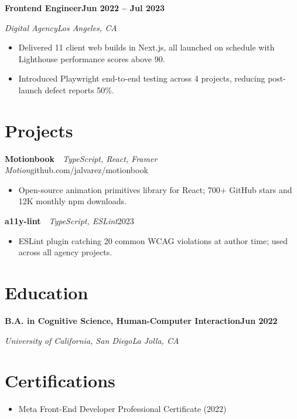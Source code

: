 \documentclass[letterpaper,10pt]{article}
\newcommand{\rRole}[4]{%
  \vspace{3pt}%
  \noindent\textbf{#1}\hfill\textbf{#4}\par
  \noindent\textit{\color{muted}#2}\hfill\textit{\color{muted}#3}\par
  \vspace{1pt}%
}
\newcommand{\rProject}[3]{%
  \vspace{3pt}%
  \noindent\textbf{#1}\ \textbar\ \textit{\color{muted}#2}\hfill#3\par
  \vspace{1pt}%
}
\newcommand{\rEdu}[4]{%
  \vspace{3pt}%
  \noindent\textbf{#1}\hfill\textbf{#4}\par
  \noindent\textit{\color{muted}#2}\hfill\textit{\color{muted}#3}\par
  \vspace{1pt}%
}
\newenvironment{rBullets}
  {\begin{itemize}[leftmargin=13pt,itemsep=2pt,parsep=0pt,topsep=2pt,
                   partopsep=0pt,label=\textbullet]}
  {\end{itemize}}
\begin{document}
\rRole{Frontend Engineer}{Digital Agency}{Los Angeles, CA}{Jun 2022 -- Jul 2023}
\begin{rBullets}
  \item Delivered 11 client web builds in Next.js, all launched on schedule with Lighthouse performance scores above 90.
  \item Introduced Playwright end-to-end testing across 4 projects, reducing post-launch defect reports 50\%.
\end{rBullets}

\section{Projects}

\rProject{Motionbook}{TypeScript, React, Framer Motion}{github.com/jalvarez/motionbook}
\begin{rBullets}
  \item Open-source animation primitives library for React; 700+ GitHub stars and 12K monthly npm downloads.
\end{rBullets}

\rProject{a11y-lint}{TypeScript, ESLint}{2023}
\begin{rBullets}
  \item ESLint plugin catching 20 common WCAG violations at author time; used across all agency projects.
\end{rBullets}

\section{Education}
\rEdu{B.A. in Cognitive Science, Human-Computer Interaction}{University of California, San Diego}{La Jolla, CA}{Jun 2022}

\section{Certifications}
\begin{rBullets}
  \item Meta Front-End Developer Professional Certificate (2022)
\end{rBullets}
\end{document}
